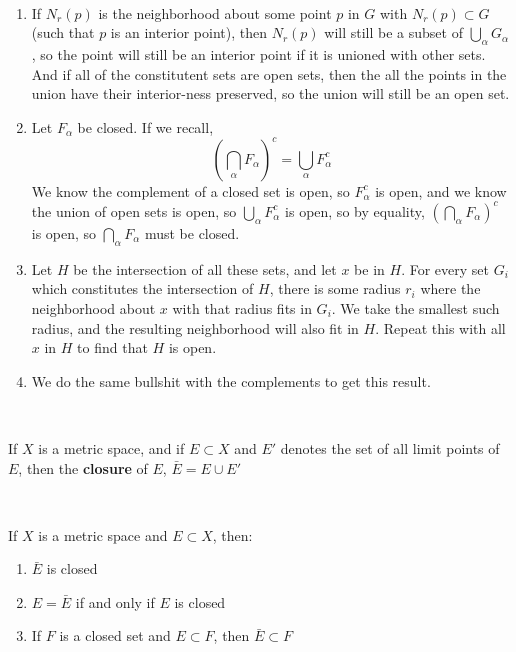 \documentclass{article}
\begin{document}
\begin{customproof}
\

\begin{enumerate}
    \item If $N_r(p)$ is the neighborhood about some point $p$ in $G$ with $N_r(p) \subset G$ (such that $p$ is an interior point), then $N_r(p)$ will still be a subset of $\bigcup_\alpha G_\alpha$, so the point will still be an interior point if it is unioned with other sets. And if all of the constitutent sets are open sets, then the all the points in the union have their interior-ness preserved, so the union will still be an open set.
    \item Let $F_\alpha$ be closed. If we recall, $$(\bigcap_\alpha F_\alpha)^c = \bigcup_\alpha F_\alpha^c$$We know the complement of a closed set is open, so $F_\alpha^c$ is open, and we know the union of open sets is open, so $\bigcup_\alpha F_\alpha^c$ is open, so by equality, $(\bigcap_\alpha F_\alpha)^c$ is open, so $\bigcap_\alpha F_\alpha$ must be closed.
    \item Let $H$ be the intersection of all these sets, and let $x$ be in $H$. For every set $G_i$ which constitutes the intersection of $H$, there is some radius $r_i$ where the neighborhood about $x$ with that radius fits in $G_i$. We take the smallest such radius, and the resulting neighborhood will also fit in $H$. Repeat this with all $x$ in $H$ to find that $H$ is open.
    \item We do the same bullshit with the complements to get this result.
\end{enumerate}
\end{customproof}

\begin{definition}
\

If $X$ is a metric space, and if $E \subset X$ and $E'$ denotes the set of all limit points of $E$, then the \textbf{closure} of $E$, $\bar{E} = E \cup E'$ 
\end{definition}

\begin{theorem}
\

If $X$ is a metric space and $E \subset X$, then:

\begin{enumerate}
    \item $\bar{E}$ is closed
    \item $E = \bar{E}$ if and only if $E$ is closed
    \item If $F$ is a closed set and $E \subset F$, then $\bar{E} \subset F$
\end{enumerate}
\end{theorem}
\end{document}
